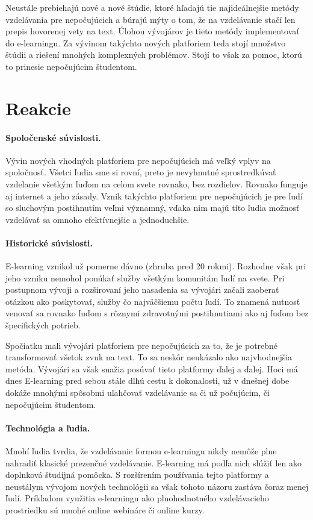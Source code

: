 \documentclass[10pt,oneside,slovak,a4paper]{article}
\begin{document}
Neustále prebiehajú nové a nové štúdie, ktoré hľadajú tie najideálnejšie metódy vzdelávania pre nepočujúcich a búrajú mýty o tom, že na vzdelávanie stačí len prepis hovorenej vety na text. Úlohou vývojárov je tieto metódy implementovať do e-learningu.  Za vývinom takýchto nových platforiem teda stojí množstvo štúdii a riešení mnohých komplexných problémov. Stojí to však za pomoc, ktorú to prinesie nepočujúcim študentom.
\section{Reakcie}
\paragraph{Spoločenské súvislosti. } 
Vývin nových vhodných platforiem pre nepočujúcich má veľký vplyv na spoločnosť. Všetci ľudia sme si rovní, preto je nevyhnutné sprostredkúvať vzdelanie všetkým ľuďom na celom svete rovnako, bez rozdielov. Rovnako funguje aj internet a jeho zásady. Vznik takýchto platforiem pre nepočujúcich je pre ľudí so sluchovým postihnutím veľmi významný, vďaka nim majú títo ľudia možnosť vzdelávať sa omnoho efektívnejšie a jednoduchšie. 
\paragraph{Historické súvislosti. } E-learning vznikol už pomerne dávno (zhruba pred 20 rokmi). Rozhodne však pri jeho vzniku nemohol ponúkať služby všetkým komunitám ľudí na svete. Pri postupnom vývoji a rozširovaní jeho nasadenia sa vývojári začali zaoberať otázkou ako poskytovať, služby čo najväčšiemu počtu ľudí. To znamená nutnosť venovať sa rovnako ľuďom s rôznymi zdravotnými postihnutiami ako aj ľuďom bez špecifických potrieb.

Spočiatku mali vývojári platforiem pre nepočujúcich za to, že je potrebné transformovať všetok zvuk na text. To sa neskôr neukázalo ako najvhodnejšia metóda. Vývojári sa však snažia posúvať tieto platformy ďalej a ďalej. Hoci má dnes E-learning pred sebou stále dlhú cestu k dokonalosti, už v dnešnej dobe dokáže mnohými spôsobmi uľahčovať vzdelávanie sa či už počujúcim, či nepočujúcim študentom.

\paragraph{Technológia a ľudia. }
Mnohí ľudia tvrdia, že vzdelávanie formou e-learningu nikdy nemôže plne nahradiť klasické prezenčné vzdelávanie. E-learning má podľa nich slúžiť len ako doplnková študijná pomôcka. S rozšírením používania tejto platformy a neustálym vývojom nových technológii sa však tohoto názoru zastáva čoraz menej ľudí. Príkladom využitia e-learningu ako plnohodnotného vzdelávacieho prostriedku sú mnohé online webináre či online kurzy. 
\end{document}
